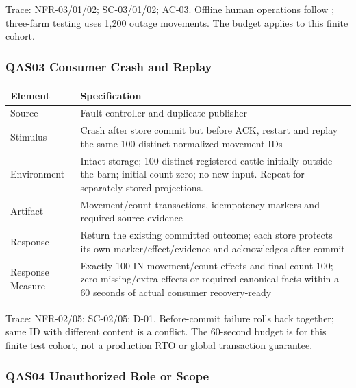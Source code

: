 Trace: NFR-03/01/02; SC-03/01/02; AC-03. Offline human operations follow
; three-farm testing uses 1,200 outage movements. The
budget applies to this finite cohort.

\subsubsection{QAS03 Consumer Crash and Replay}\label{sec:3.4.3}

{\small
\begin{longtable}[]{|>{\raggedright\arraybackslash}p{}|>{\raggedright\arraybackslash}p{}|}
\hline
\textbf{Element} & \textbf{Specification} \\ \hline
\endhead
Source & Fault controller and duplicate publisher \\ \hline
Stimulus & Crash after store commit but before ACK, restart and replay
the same 100 distinct normalized movement IDs \\ \hline
Environment & Intact storage; 100 distinct registered cattle initially
outside the barn; initial count zero; no new input. Repeat for
separately stored projections. \\ \hline
Artifact & Movement/count transactions, idempotency markers and required
source evidence \\ \hline
Response & Return the existing committed outcome; each store protects
its own marker/effect/evidence and acknowledges after commit \\ \hline
Response Measure & Exactly 100 IN movement/count effects and final count
100; zero missing/extra effects or required canonical facts within a
60 seconds of actual consumer recovery-ready \\ \hline
\end{longtable}
}

Trace: NFR-02/05; SC-02/05; D-01. Before-commit failure rolls back
together; same ID with different content is a conflict. The 60-second
budget is for this finite test cohort, not a production RTO or global
transaction guarantee.

\subsubsection{QAS04 Unauthorized Role or Scope}\label{sec:3.4.4}

